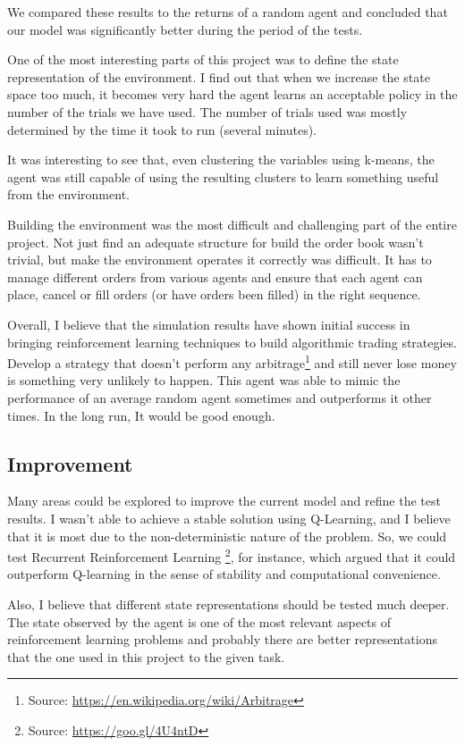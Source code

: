 \documentclass[a4paper]{article}
\begin{document}
We compared these results to the returns of a random agent and concluded that our model was significantly better during the period of the tests.

One of the most interesting parts of this project was to define the state representation of the environment. I find out that when we increase the state space too much, it becomes very hard the agent learns an acceptable policy in the number of the trials we have used. The number of trials used was mostly determined by the time it took to run (several minutes).

It was interesting to see that, even clustering the variables using k-means, the agent was still capable of using the resulting clusters to learn something useful from the environment.

Building the environment was the most difficult and challenging part of the entire project. Not just find an adequate structure for build the order book wasn't trivial, but make the environment operates it correctly was difficult. It has to manage different orders from various agents and ensure that each agent can place, cancel or fill orders (or have orders been filled) in the right sequence.

Overall, I believe that the simulation results have shown initial success in bringing reinforcement learning techniques to build algorithmic trading strategies. Develop a strategy that doesn't perform any arbitrage\footnote{Source: \url{https://en.wikipedia.org/wiki/Arbitrage}} and still never lose money is something very unlikely to happen. This agent was able to mimic the performance of an average random agent sometimes and outperforms it other times. In the long run, It would be good enough.


\subsection{Improvement}

Many areas could be explored to improve the current model and refine the test results. I wasn't able to achieve a stable solution using Q-Learning, and I believe that it is most due to the non-deterministic nature of the problem. So, we could test Recurrent Reinforcement Learning \footnote{Source: \url{https://goo.gl/4U4ntD}}, for instance, which \cite{du1algorithm} argued that it could outperform Q-learning in the sense of stability and computational convenience.

Also, I believe that different state representations should be tested much deeper. The state observed by the agent is one of the most relevant aspects of reinforcement learning problems and probably there are better representations that the one used in this project to the given task.
\end{document}
